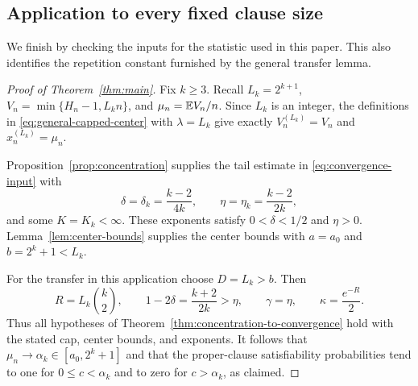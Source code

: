 \subsection{Application to every fixed clause size}

We finish by checking the inputs for the statistic used in this paper.
This also identifies the repetition constant furnished by the general
transfer lemma.

\begin{proof}[Proof of Theorem~\ref{thm:main}]
Fix \(k\ge3\).  Recall \(L_k=2^{k+1}\),
\(V_n=\min\{H_n-1,L_kn\}\), and \(\mu_n=\mathbb E V_n/n\).
Since \(L_k\) is an integer, the definitions in
\eqref{eq:general-capped-center} with \(\lambda=L_k\) give exactly
\(V_n^{(L_k)}=V_n\) and \(x_n^{(L_k)}=\mu_n\).

Proposition~\ref{prop:concentration} supplies the tail estimate in
\eqref{eq:convergence-input} with
\[
 \delta=\delta_k=\frac{k-2}{4k},\qquad
 \eta=\eta_k=\frac{k-2}{2k},
\]
and some \(K=K_k<\infty\).  These exponents satisfy
\(0<\delta<1/2\) and \(\eta>0\).  Lemma~\ref{lem:center-bounds}
supplies the center bounds with
\(a=a_0\) and \(b=2^k+1<L_k\).

For the transfer in this application choose \(D=L_k>b\).  Then
\[
 R=L_k\binom{k}{2},\qquad
 1-2\delta=\frac{k+2}{2k}>\eta,
 \qquad \gamma=\eta,\qquad \kappa=\frac{e^{-R}}2.
\]
Thus all hypotheses of Theorem~\ref{thm:concentration-to-convergence}
hold with the stated cap, center bounds, and exponents.  It follows that
\(\mu_n\to\alpha_k\in[a_0,2^k+1]\) and that the proper-clause
satisfiability probabilities tend to one for \(0\le c<\alpha_k\)
and to zero for \(c>\alpha_k\), as claimed.
\end{proof}
